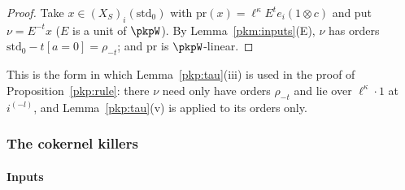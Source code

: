 \documentclass[10pt]{amsart}
\theoremstyle{definition}
\theoremstyle{remark}
\begin{document}
\begin{proof}
Take $x\in(X_S)_i(\mathrm{std}_0)$ with $\mathrm{pr}(x)=\ell^\kappa E^te_i(1\otimes c)$ and put
$\nu=E^{-t}x$ ($E$ is a unit of $\pkpW$). By Lemma~\ref{pkm:inputs}(E), $\nu$ has orders
$\mathrm{std}_0-t[a=0]=\rho_{-t}$; and $\mathrm{pr}$ is $\pkpW$-linear.
\end{proof}

This is the form in which Lemma~\ref{pkp:tau}(iii) is used in the proof of
Proposition~\ref{pkp:rule}: there $\nu$ need only have orders $\rho_{-t}$ and lie over $\ell^\kappa\cdot1$
at $i^{(-l)}$, and Lemma~\ref{pkp:tau}(v) is applied to its orders only.

\subsubsection{The cokernel killers}\label{pkm:ss-kill}

\paragraph*{Inputs}
\end{document}
